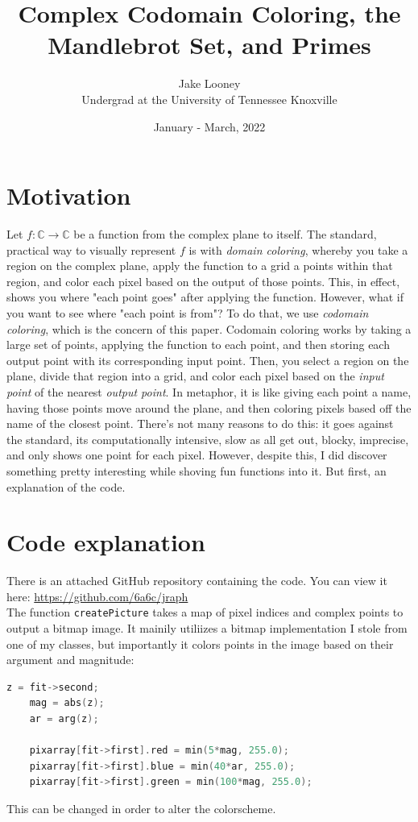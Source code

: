 \documentclass[letterpaper,12pt]{article}
\begin{document}
\title{Complex Codomain Coloring, the Mandlebrot Set, and Primes}
\author{Jake Looney\\ Undergrad at the University of Tennessee Knoxville}
\date{January - March, 2022}
\maketitle

\tableofcontents
\newpage
{}

\section{Motivation}
Let $f:\mathbb{C}\rightarrow\mathbb{C}$ be a function from the complex plane to itself.
The standard, practical way to visually represent $f$ is with \textit{domain coloring}, whereby you take a region
on the complex plane, apply the function to a grid a points within that region, and color each pixel based on the output of those points.
This, in effect, shows you where "each point goes" after applying the function. However, what if you want to see
where "each point is from"? To do that, we use \textit{codomain coloring}, which is the concern of this paper.
Codomain coloring works by taking a large set of points, applying the function to each point,
and then storing each output point with its corresponding input point. Then, you select a region on the plane,
divide that region into a grid, and color each pixel based on the \textit{input point} of the nearest \textit{output point}.
In metaphor, it is like giving each point a name, having those points move around the plane, and then coloring pixels based off
the name of the closest point.
There's not many reasons to do this: it goes against the standard, its computationally intensive, slow as all get out, blocky, imprecise, and only shows one point for each pixel.
However, despite this, I did discover something pretty interesting while shoving fun functions into it. But first, an explanation of the code.

\section{Code explanation}
There is an attached GitHub repository containing the code. You can view it here: \url{https://github.com/6a6c/jraph} \\

The function \verb|createPicture| takes a map of pixel indices and complex points to output a bitmap image.
It mainily utiliizes a bitmap implementation I stole from one of my classes,
but importantly it colors points in the image based on their argument and magnitude:
\begin{lstlisting}[language=c++]
    z = fit->second;
    mag = abs(z);
    ar = arg(z);

    pixarray[fit->first].red = min(5*mag, 255.0);
    pixarray[fit->first].blue = min(40*ar, 255.0);
    pixarray[fit->first].green = min(100*mag, 255.0);
\end{lstlisting}
This can be changed in order to alter the colorscheme.\\
\end{document}
